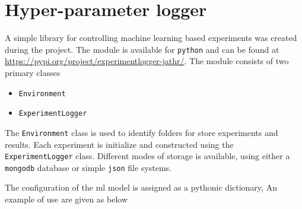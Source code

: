 \chapter{Hyper-parameter logger}

A simple library for controlling machine learning based experiments was created during the project. The module is available for \texttt{python} and can be found at \url{https://pypi.org/project/experimentlogger-jathr/}. The module consists of two primary classes

\begin{itemize}
    \item \texttt{Environment}
    \item \texttt{ExperimentLogger}
\end{itemize}


The \texttt{Environment} class is used to identify folders for store experiments and results. Each experiment is initialize and constructed using the \texttt{ExperimentLogger} class. Different modes of storage is available, using either a \texttt{mongodb} database or simple \texttt{json} file systems.

The configuration of the \gls{ml} model is assigned as a pythonic dictionary, An example of use are given as below 



